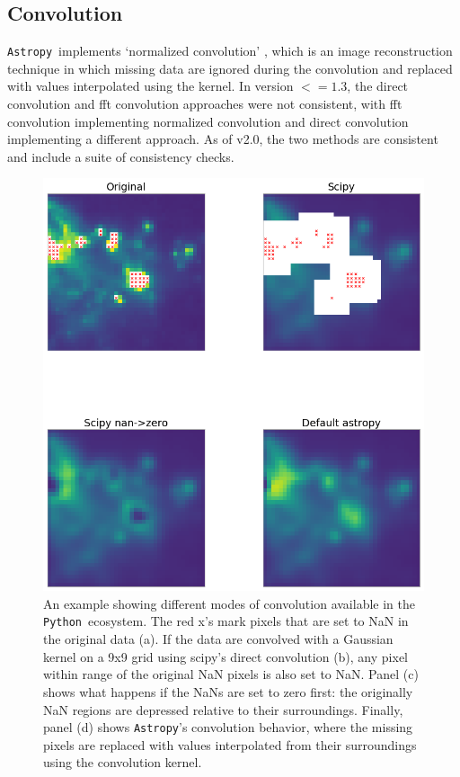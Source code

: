 \documentclass[modern]{aastex61}
\newcommand{\package}[1]{\texttt{#1}}
\newcommand{\python}{\package{Python}}
\newcommand{\astropypkg}{\package{Astropy}}
\begin{document}
\subsection{Convolution}

\astropypkg\ implements `normalized convolution' \citep[e.g.,][]{Knutsson1993}, which is an image reconstruction technique in which missing data are ignored during the convolution and replaced with values interpolated using the kernel.   In version $<=1.3$, the direct convolution and fft convolution approaches were not consistent, with fft convolution implementing normalized convolution and direct convolution implementing a different approach.  As of v2.0, the two methods are consistent and include a suite of consistency checks.


\begin{figure}
\includegraphics[width=\textwidth]{convolution_example.png}
An example showing different modes of convolution available in the \python\ ecosystem.  The red x's mark pixels that are set to NaN in the original data (a).  If the data are convolved with a Gaussian kernel on a 9x9 grid using scipy's direct convolution (b), any pixel within range of the original NaN pixels is also set to NaN.  Panel (c) shows what happens if the NaNs are set to zero first: the originally NaN regions are depressed relative to their surroundings.  Finally, panel (d) shows \astropypkg's convolution behavior, where the missing pixels are replaced with values interpolated from their surroundings using the convolution kernel.
\end{figure}
\end{document}
